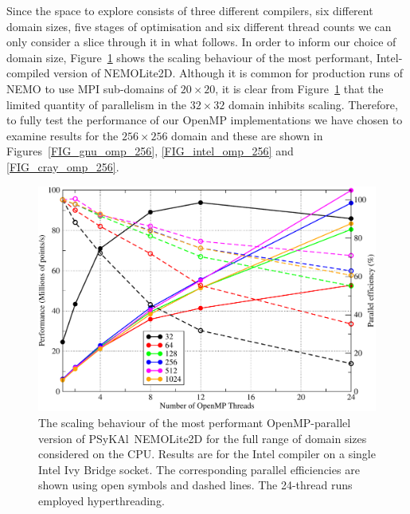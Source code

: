 \documentclass[journal]{IEEEtran}
\newlength{\picwidth}
\newcommand{\psykal}{{PS}y{KA}l}
\begin{document}
Since the space to explore consists of three different compilers, six
different domain sizes, five stages of optimisation and six different
thread counts we can only consider a slice through it in what follows.
In order to inform our choice of domain size,
Figure~\ref{FIG_omp_domain_size} shows the scaling behaviour of the
most performant, Intel-compiled version of NEMOLite2D. Although it is
common for production runs of NEMO to use MPI sub-domains of $20
\times 20$, it is clear from Figure~\ref{FIG_omp_domain_size} that the
limited quantity of parallelism in the $32 \times 32$ domain inhibits
scaling. Therefore, to fully test the performance of our OpenMP
implementations we have chosen to examine results for the $256 \times
256$ domain and these are shown in Figures~\ref{FIG_gnu_omp_256},
\ref{FIG_intel_omp_256} and \ref{FIG_cray_omp_256}.

\begin{figure}
\centering
\includegraphics[width=\picwidth]{omp_scaling_problem_size}
\caption{The scaling behaviour of the most performant OpenMP-parallel
  version of \psykal\ NEMOLite2D for the full range of domain sizes
  considered on the CPU. Results are for the Intel compiler on a
  single Intel Ivy Bridge socket. The corresponding parallel
  efficiencies are shown using open symbols and dashed lines. The
  24-thread runs employed hyperthreading.}
\label{FIG_omp_domain_size}
\end{figure}
\end{document}
